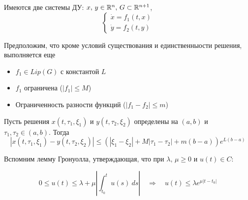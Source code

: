 Имеются две системы ДУ: $x,\, y \in \mathbb{R}^n,\, G\subset \mathbb{R}^{n+1}$,
$$
\begin{cases*}
  \dot{x} = f_1(t, x) \\
  \dot{y} = f_2(t, y)
\end{cases*}
$$

Предположим, что кроме условий существования и единственныости решения, выполняется еще

\begin{itemize}
  \item $f_1 \in Lip(G)$ с константой $L$
  \item $f_1$ ограничена ($|f_1| \leq M$)
  \item Ограниченность разности функций ($|f_1 - f_2|\leq m$)
\end{itemize}


\begin{theorem}
  Пусть решения $x(t, \tau_1, \xi_1)$ и $y(t, \tau_2, \xi_2)$ определены на $(a, b)$ и $\tau_1, \tau_2 \in (a, b)$.
  Тогда
  $$|x(t, \tau_1, \xi_1) - y(t, \tau_2, \xi_2)| \leq (|\xi_1 - \xi_2| + M|\tau_1 - \tau_2| + m(b - a))e^{L(b-a)}$$
\end{theorem}

Вспомним лемму Гронуолла, утверждающая, что при $\lambda,\, \mu \geq 0$ и $u(t) \in C$:

$$0 \leq u(t) \leq \lambda + \mu \left|\int_{t_0}^t u(s)\ ds \right|\quad \Rightarrow \quad u(t) \leq \lambda e^{\mu|t-t_0|}$$

